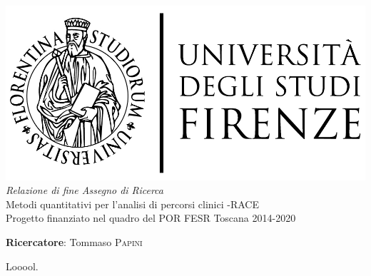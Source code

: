 \documentclass{article}
\begin{document}
    
    \begin{center}
        \includegraphics[scale=0.2]{logo_unifi.jpg}\\[4cm]
        \textit{Relazione di fine Assegno di Ricerca}\\[0.3cm]
        {\Huge Metodi quantitativi per l'analisi di percorsi clinici -RACE}\\[0.2cm]
        Progetto finanziato nel quadro del POR FESR Toscana 2014-2020
    \end{center}
    
    \vfill
    
    \textbf{Ricercatore}: Tommaso \textsc{Papini}
    
    \clearpage
    
    Looool.
    
    \clearpage
    
	
	
\end{document}
